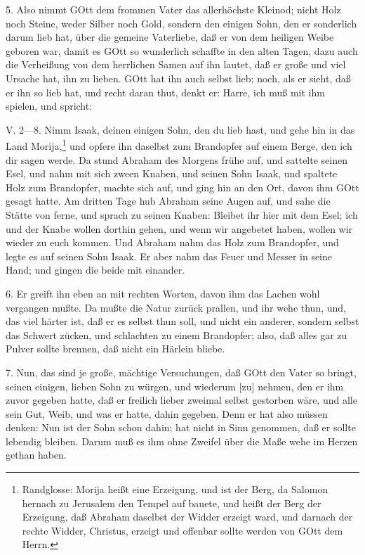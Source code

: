 5. Also nimmt GOtt dem frommen Vater das allerhöchste Kleinod; nicht Holz noch Steine, weder Silber noch Gold, sondern den einigen Sohn, den er sonderlich darum lieb hat, über die gemeine Vaterliebe, daß er von dem heiligen Weibe geboren war, damit es GOtt so wunderlich schaffte in den alten Tagen, dazu auch die Verheißung von dem herrlichen Samen auf ihn lautet, daß er große und viel Ursache hat, ihn zu lieben. GOtt hat ihn auch selbst lieb; noch, als er sieht, daß er ihn so lieb hat, und recht daran thut, denkt er: Harre, ich muß mit ihm spielen, und spricht:

\begin{schriftzitat}
V. 2—8. Nimm Isaak, deinen einigen Sohn, den du lieb hast, und gehe hin in das Land Morija,\footnote{Randglosse: Morija heißt eine Erzeigung, und ist der Berg, da Salomon hernach zu Jerusalem den Tempel auf bauete, und heißt der Berg der Erzeigung, daß Abraham daselbst der Widder erzeigt ward, und darnach der rechte Widder, Christus, erzeigt und offenbar sollte werden von GOtt dem Herrn.} und opfere ihn daselbst zum Brandopfer auf einem Berge, den ich dir sagen werde. Da stund Abraham des Morgens frühe auf, und sattelte seinen Esel, und nahm mit sich zween Knaben, und seinen Sohn Isaak, und spaltete Holz zum Brandopfer, machte sich auf, und ging hin an den Ort, davon ihm GOtt gesagt hatte. Am dritten Tage hub Abraham seine Augen auf, und sahe die Stätte von ferne, und sprach zu seinen Knaben: Bleibet ihr hier mit dem Esel; ich und der Knabe wollen dorthin gehen, und wenn wir angebetet haben, wollen wir wieder zu euch kommen. Und Abraham nahm das Holz zum Brandopfer, und legte es auf seinen Sohn Isaak. Er aber nahm das Feuer und Messer in seine Hand; und gingen die beide mit einander.
\end{schriftzitat}

6. Er greift ihn eben an mit rechten Worten, davon ihm das Lachen wohl vergangen mußte. Da mußte die Natur zurück prallen, und ihr wehe thun, und, das viel härter ist, daß er es selbst thun soll, und nicht ein anderer, sondern selbst das Schwert zücken, und schlachten zu einem Brandopfer; also, daß alles gar zu Pulver sollte brennen, daß nicht ein Härlein bliebe.

7. Nun, das sind je große, mächtige Versuchungen, daß GOtt den Vater so bringt, seinen einigen, lieben Sohn zu würgen, und wiederum [zu] nehmen, den er ihm zuvor gegeben hatte, daß er freilich lieber zweimal selbst gestorben wäre, und alle sein Gut, Weib, und was er hatte, dahin gegeben. Denn er hat also müssen denken: Nun ist der Sohn schon dahin; hat nicht in Sinn genommen, daß er sollte lebendig bleiben. Darum muß es ihm ohne Zweifel über die Maße wehe im Herzen gethan haben.

